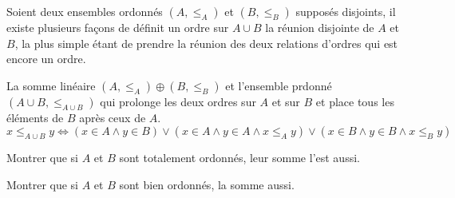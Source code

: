 \documentclass[french]{report}
\begin{document}
\begin{exo}
    Soient deux ensembles ordonnés \(\left(A,\leq_A\right)\) et \(\left(B,\leq_B\right)\)
    supposés disjoints, il existe plusieurs façons de définit un ordre sur \(A\cup B\)
    la réunion disjointe de \(A\) et \(B\), la plus simple étant de prendre
    la réunion des deux relations d'ordres qui est encore un ordre.

    La somme linéaire \(\left(A,\leq_A\right)\oplus\left(B,\leq_B\right)\) et l'ensemble
    prdonné \(\left(A\cup B,\leq_{A\cup B}\right)\) qui prolonge les deux ordres sur \(A\)
    et sur \(B\) et place tous les éléments de \(B\) après ceux de \(A\).
    \[x\leq_{A\cup B} y \Leftrightarrow \left(x\in A\land y\in B\right)
    \lor\left(x\in A\land y\in A\land x\leq_A y\right)\lor
    \left(x\in B\land y\in B\land x\leq_B y\right)\]
    \begin{q}{1}
        Montrer que si \(A\) et \(B\) sont totalement ordonnés, leur somme l'est aussi.
    \end{q}
    \begin{q}{2}
        Montrer que si \(A\) et \(B\) sont bien ordonnés, la somme aussi.
    \end{q}
\end{exo}
\end{document}
